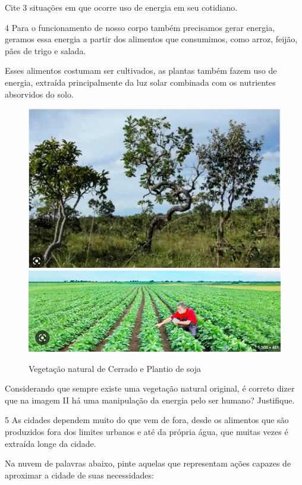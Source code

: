 Cite 3 situações em que ocorre uso de energia em seu cotidiano.



\num{4} Para o funcionamento de nosso corpo também precisamos gerar energia,
geramos essa energia a partir dos alimentos que consumimos, como arroz,
feijão, pães de trigo e salada.

Esses alimentos costumam ser cultivados, as plantas também fazem uso de
energia, extraída principalmente da luz solar combinada com os
nutrientes absorvidos do solo.

\begin{figure}[htpb!]
\includegraphics[width=.5\textwidth]{./imgs/img6.png}
\includegraphics[width=.5\textwidth]{./imgs/img7.png}
\caption{Vegetação natural de Cerrado e Plantio de soja}
\end{figure}

Considerando que sempre existe uma vegetação natural original, é correto
dizer que na imagem II há uma manipulação da energia pelo ser humano?
Justifique.



\num{5} As cidades dependem muito do que vem de fora, desde os alimentos que
são produzidos fora dos limites urbanos e até da própria água, que
muitas vezes é extraída longe da cidade.

Na nuvem de palavras abaixo, pinte aquelas que representam ações capazes
de aproximar a cidade de suas necessidades:

